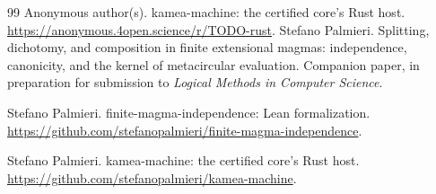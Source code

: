 \documentclass[acmsmall,screen,review]{acmart}
\begin{document}
\begin{thebibliography}{99}
Anonymous author(s).
\newblock kamea-machine: the certified core's Rust host.
\newblock \url{https://anonymous.4open.science/r/TODO-rust}.
\else
{}
Stefano Palmieri.
\newblock Splitting, dichotomy, and composition in finite extensional
  magmas: independence, canonicity, and the kernel of metacircular
  evaluation.
\newblock Companion paper, in preparation for submission to
  \emph{Logical Methods in Computer Science}.

Stefano Palmieri.
\newblock finite-magma-independence: Lean formalization.
\newblock \url{https://github.com/stefanopalmieri/finite-magma-independence}.

Stefano Palmieri.
\newblock kamea-machine: the certified core's Rust host.
\newblock \url{https://github.com/stefanopalmieri/kamea-machine}.
\fi

\end{thebibliography}
\end{document}
